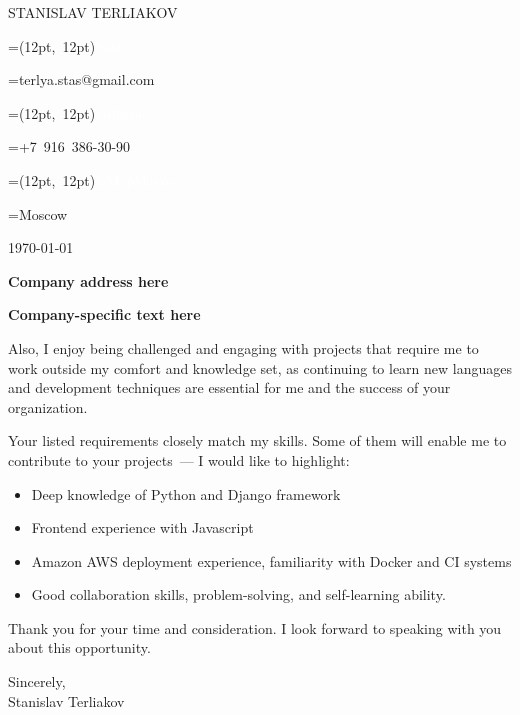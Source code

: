 \documentclass[9pt]{article}
\newcommand{\vcenteredhbox}[1]{
	\begingroup%
		\setbox0=\hbox{#1}\parbox{\wd0}{\box0}%
	\endgroup%
}
\newcommand{\icon}[3]{
	\vcenteredhbox{\makebox(#2, #2){\textcolor{white}{\large\csname fa#1\endcsname}}}
	\hspace{0.2cm}
	\vcenteredhbox{#3}
}
\begin{document}
	\begin{tcolorbox}[size=tight,
			sharp corners,
			enhanced,
			colback=leftBackground,
			colframe=leftBackground,
			coltext=white,
			left=2cm,
			right=2cm,
			bottom=1cm,
			top=1cm]
		\linespread{1.5}
		\setlength{\parskip}{12px}

		\center

		{\LARGE STANISLAV TERLIAKOV}

		\icon{At}{12pt}{terlya.stas@gmail.com}
		\hfill
		\icon{Phone}{12pt}{+7 916 386-30-90}
		\hfill
		\icon{MapMarker}{12pt}{Moscow}
	\end{tcolorbox}

	\vspace{1cm}

	\hspace{1.5cm}
	\begin{minipage}{\linewidth - 4cm}
		\setlength{\parindent}{2em}
		\setlength{\parskip}{6px}
		\noindent
		\today

		\noindent
        \textbf{\Large Company address here}

		\vspace{1cm}

        \textbf{\Large Company-specific text here}

		Also, I enjoy being challenged and engaging with projects that require me to work outside my comfort and knowledge set,
        as continuing to learn new languages and development techniques are essential for me and the success of your organization.

		Your listed requirements closely match my skills. Some of them will enable me to contribute to your
        projects~--- I would like to highlight:

		\vspace{-9px}
		\begin{itemize}
			\setlength{\itemsep}{0px}
			\item Deep knowledge of Python and Django framework
			\item Frontend experience with Javascript
			\item Amazon AWS deployment experience, familiarity with Docker and CI systems
			\item Good collaboration skills, problem-solving, and self-learning ability.
		\end{itemize}

		Thank you for your time and consideration. I look forward to speaking with you about this opportunity.

		Sincerely,\\
		\indent Stanislav Terliakov
	\end{minipage}
\end{document}
